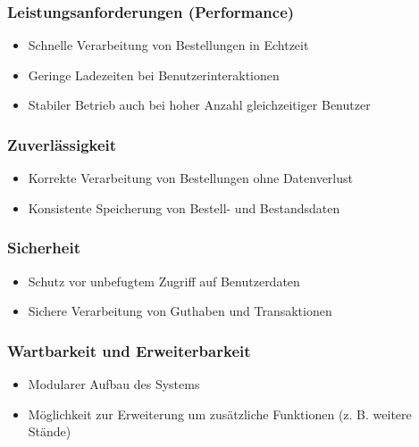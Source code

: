\subsubsection*{Leistungsanforderungen (Performance)}
\begin{itemize}
    \item Schnelle Verarbeitung von Bestellungen in Echtzeit
    \item Geringe Ladezeiten bei Benutzerinteraktionen
    \item Stabiler Betrieb auch bei hoher Anzahl gleichzeitiger Benutzer
\end{itemize}

\subsubsection*{Zuverlässigkeit}
\begin{itemize}
    \item Korrekte Verarbeitung von Bestellungen ohne Datenverlust
    \item Konsistente Speicherung von Bestell- und Bestandsdaten
\end{itemize}

\subsubsection*{Sicherheit}
\begin{itemize}
    \item Schutz vor unbefugtem Zugriff auf Benutzerdaten
    \item Sichere Verarbeitung von Guthaben und Transaktionen
\end{itemize}

\subsubsection*{Wartbarkeit und Erweiterbarkeit}
\begin{itemize}
    \item Modularer Aufbau des Systems
    \item Möglichkeit zur Erweiterung um zusätzliche Funktionen (z. B. weitere Stände)
\end{itemize}